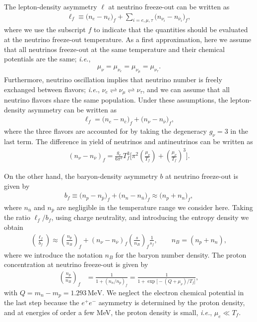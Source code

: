 The lepton-density asymmetry $\ell $ at neutrino freeze-out can be written as
\begin{align}
\ell_f \equiv\big(n_e-n_{\overline{e}}\big)_f+\sum_{i=e,\mu, \tau}\big(n_{\nu_i}-n_{\overline{\nu}_i}\big)_f,
\end{align}
where we use the subscript $f$ to indicate that the quantities should be evaluated at the neutrino freeze-out temperature. As a first approximation, here we assume that all neutrinos freeze-out at the same temperature and their chemical potentials are the same; {\it i.e.\/},
\begin{align}
\mu_\nu=\mu_{\nu_e}=\mu_{\nu_\mu}=\mu_{\nu_\tau}.
\end{align}
Furthermore, neutrino oscillation implies that neutrino number is freely exchanged between flavors; {\it i.e.\/}, $\nu_e\rightleftharpoons\nu_\mu\rightleftharpoons\nu_\tau$, and we can assume that all neutrino flavors share the same population. Under these assumptions, the lepton-density asymmetry can be written as
\begin{align}
\label{L_asymmetry} 
\ell_f=\big(n_e-n_{\overline{e}}\big)_f+\big(n_{\nu}-n_{\overline{\nu}}\big)_f,
\end{align}
where the three flavors are accounted for by taking the degeneracy $g_\nu=3$ in the last term. The difference in yield of neutrinos and antineutrinos can be written as
\begin{align}
\label{Excess_Neutrino}
\left(n_\nu-n_{\overline{\nu}}\right)_f=\frac{g_\nu}{6\pi^2}T^3_f\bigg[\pi^2\left(\frac{\mu_\nu}{T_f}\right)+\left(\frac{\mu_\nu}{T_f}\right)^{\!\!3}\bigg].
\end{align}


On the other hand, the baryon-density asymmetry $b$ at neutrino freeze-out is given by
\begin{align}
\label{B_asymmetry}
b_f \equiv\big(n_p-n_{\overline{p}}\big)_f+\big(n_n-n_{\overline{n}}\big)_f \approx \big(n_p+n_n\big)_f,
\end{align}
where $n_{\overline{n}}$ and $n_{\overline{p}}$ are negligible in the temperature range we consider here. Taking the ratio $\ell_f/b_f$, using charge neutrality, and introducing the entropy density we obtain
\begin{align}\label{Lf_Bf}
\left(\frac{\ell_f}{b_f}\right)  
\approx\left(\frac{n_p}{n_B} \right)_f+\left(n_{\nu}-n_{\overline{\nu}}\right)_f \left(\frac{s}{n_B}\right)_f \frac{1}{s_f},\qquad n_B=(n_p+n_n),
\end{align}
where we introduce the notation $n_B$ for the baryon number density. The proton concentration at neutrino freeze-out is given by
\begin{align}
\label{X_proton}
\left(\frac{n_p}{n_B}\right)_f&=\frac{1}{1+(n_n/n_p)_f}=\frac{1}{1+\exp{\big[-\left(Q+\mu_\nu\right)/T_f\big]}},
\end{align}
with $Q=m_n-m_p=1.293\,\mathrm{MeV}$. We neglect the electron chemical potential in the last step because the $e^+e^-$ asymmetry is determined by the proton density, and at energies of order a few MeV, the proton density is small, {\it i.e.\/}, $\mu_e\ll T_f$. 

